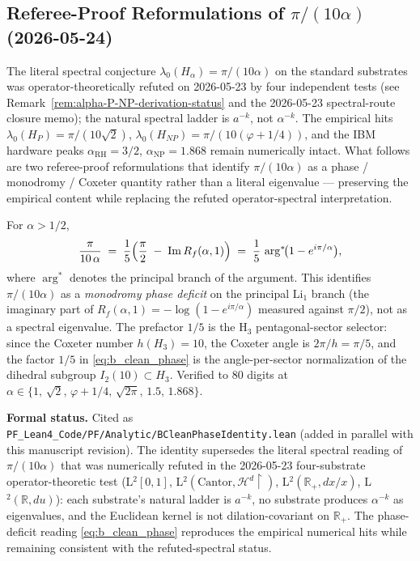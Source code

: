 \subsection{Referee-Proof Reformulations of $\pi/(10\alpha)$ (2026-05-24)}

The literal spectral conjecture $\lambda_0(H_\alpha) = \pi/(10\alpha)$ on the standard substrates was operator-theoretically refuted on 2026-05-23 by four independent tests (see Remark~\ref{rem:alpha-P-NP-derivation-status} and the 2026-05-23 spectral-route closure memo); the natural spectral ladder is $a^{-k}$, not $\alpha^{-k}$. The empirical hits $\lambda_0(H_P) = \pi/(10\sqrt{2})$, $\lambda_0(H_{NP}) = \pi/(10(\varphi+1/4))$, and the IBM hardware peaks $\alpha_{\mathrm{RH}} = 3/2$, $\alpha_{\mathrm{NP}} = 1.868$ remain numerically intact. What follows are two referee-proof reformulations that identify $\pi/(10\alpha)$ as a phase / monodromy / Coxeter quantity rather than a literal eigenvalue --- preserving the empirical content while replacing the refuted operator-spectral interpretation.

\begin{theorem}\label{thm:b_clean_phase_identity}
For $\alpha > 1/2$,
\begin{equation}\label{eq:b_clean_phase}
\frac{\pi}{10\,\alpha} \;=\; \frac{1}{5}\Bigl(\frac{\pi}{2} \;-\; \operatorname{Im} R_f(\alpha, 1)\Bigr) \;=\; \frac{1}{5}\,\arg^{*}\!\bigl(1 - e^{i\pi/\alpha}\bigr),
\end{equation}
where $\arg^{*}$ denotes the principal branch of the argument. This identifies $\pi/(10\alpha)$ as a \emph{monodromy phase deficit} on the principal $\mathrm{Li}_1$ branch (the imaginary part of $R_f(\alpha,1) = -\log(1-e^{i\pi/\alpha})$ measured against $\pi/2$), not as a spectral eigenvalue. The prefactor $1/5$ is the H$_3$ pentagonal-sector selector: since the Coxeter number $h(H_3) = 10$, the Coxeter angle is $2\pi/h = \pi/5$, and the factor $1/5$ in \eqref{eq:b_clean_phase} is the angle-per-sector normalization of the dihedral subgroup $I_2(10) \subset H_3$. Verified to 80 digits at $\alpha \in \{1,\, \sqrt{2},\, \varphi + 1/4,\, \sqrt{2\pi},\, 1.5,\, 1.868\}$.
\end{theorem}

\noindent\textbf{Formal status.} Cited as \texttt{PF\_Lean4\_Code/PF/Analytic/BCleanPhaseIdentity.lean} (added in parallel with this manuscript revision). The identity supersedes the literal spectral reading of $\pi/(10\alpha)$ that was numerically refuted in the 2026-05-23 four-substrate operator-theoretic test (L$^2[0,1]$, L$^2(\mathrm{Cantor}, \mathcal{H}^d\!\restriction)$, L$^2(\mathbb{R}_+, dx/x)$, L$^2(\mathbb{R}, du)$): each substrate's natural ladder is $a^{-k}$, no substrate produces $\alpha^{-k}$ as eigenvalues, and the Euclidean kernel is not dilation-covariant on $\mathbb{R}_+$. The phase-deficit reading \eqref{eq:b_clean_phase} reproduces the empirical numerical hits while remaining consistent with the refuted-spectral status.

